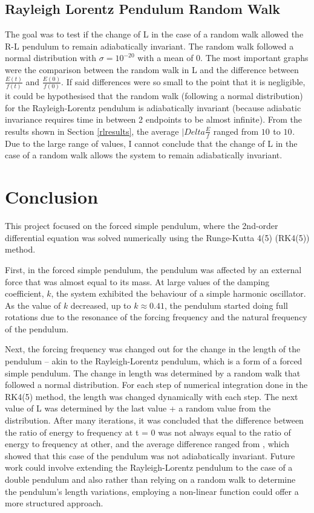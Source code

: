 \documentclass[10pt, twocolumn]{article}
\begin{document}
\subsection{Rayleigh Lorentz Pendulum Random Walk}
The goal was to test if the change of L in the case of a random walk allowed the R-L pendulum to remain adiabatically invariant. The random walk followed a normal distribution with $\sigma = 10^{-20}$ with a mean of 0. The most important graphs were the comparison between the random walk in L and the difference between $\frac{E(t)}{f(t)}$ and $\frac{E(0)}{f(0)}$. If said differences were so small to the point that it is negligible, it could be hypothesised that the random walk (following a normal distribution) for the Rayleigh-Lorentz pendulum is adiabatically invariant (because adiabatic invariance requires time in between 2 endpoints to be almost infinite). From the results shown in Section \ref{rlresults}, the average $|Delta\frac{E}{f}$ ranged from $10^{}$ to $10^{}$. Due to the large range of values, I cannot conclude that the change of L in the case of a random walk allows the system to remain adiabatically invariant.

\section{Conclusion}
This project focused on the forced simple pendulum, where the 2nd-order differential equation was solved numerically using the Runge-Kutta 4(5) (RK4(5)) method.

First, in the forced simple pendulum, the pendulum was affected by an external force that was almost equal to its mass. At large values of the damping coefficient, $k$, the system exhibited the behaviour of a simple harmonic oscillator. As the value of $k$ decreased, up to $k\approx 0.41$, the pendulum started doing full rotations due to the resonance of the forcing frequency and the natural frequency of the pendulum.

Next, the forcing frequency was changed out for the change in the length of the pendulum -- akin to the Rayleigh-Lorentz pendulum, which is a form of a forced simple pendulum. The change in length was determined by a random walk that followed a normal distribution. For each step of numerical integration done in the RK4(5) method, the length was changed dynamically with each step. The next value of L was determined by the last value + a random value from the distribution. After many iterations, it was concluded that the difference between the ratio of energy to frequency at t = 0 was not always equal to the ratio of energy to frequency at other, and the average difference ranged from , which showed that this case of the pendulum was not adiabatically invariant. Future work could involve extending the Rayleigh-Lorentz pendulum to the case of a double pendulum and also rather than relying on a random walk to determine the pendulum's length variations, employing a non-linear function could offer a more structured approach. 
\newpage
\end{document}
